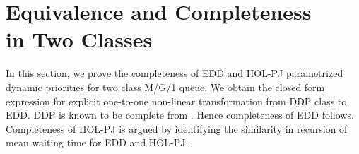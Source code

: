 \documentclass[letterpaper, 10 pt, conference]{ieeeconf}  %
\begin{document}
\section{Equivalence and Completeness\\ in Two Classes}
\label{sec:completeness_proofs}
In this section, we prove the completeness of EDD and HOL-PJ parametrized dynamic priorities for two class M/G/1 queue. We obtain the closed form expression for explicit one-to-one non-linear transformation from DDP class to EDD. DDP is known to be complete from \cite{federgruen}. Hence completeness of EDD follows. Completeness of HOL-PJ is argued by identifying the similarity in recursion of mean waiting time for EDD and HOL-PJ. 
%
%
\end{document}
